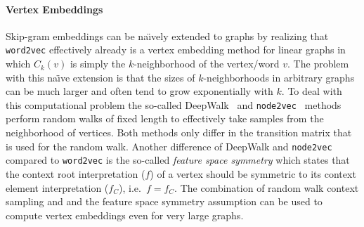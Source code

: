 \paragraph{Vertex Embeddings}
Skip-gram embeddings can be  na{\"\i}vely extended to graphs by realizing that \texttt{word2vec} effectively already is a vertex embedding method for linear graphs in which $C_k(v)$ is simply the $k$-neighborhood of the vertex/word $v$.
The problem with this na{\"\i}ve extension is that the sizes of $k$-neighborhoods in arbitrary graphs can be much larger and often tend to grow exponentially with $k$.
To deal with this computational problem the so-called DeepWalk~\cite{Perozzi2014} and \texttt{node2vec}~\cite{Grover2016} methods perform random walks of fixed length to effectively take samples from the neighborhood of vertices.
Both methods only differ in the transition matrix that is used for the random walk.
Another difference of DeepWalk and \texttt{node2vec} compared to \texttt{word2vec} is the so-called \textit{feature space symmetry} which states that the context root interpretation ($f$) of a vertex should be symmetric to its context element interpretation ($f_C$), i.e.\ $f = f_C$.
The combination of random walk context sampling and and the feature space symmetry assumption can be used to compute vertex embeddings even for very large graphs.

